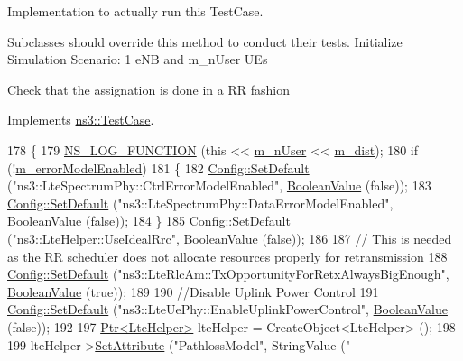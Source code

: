 Implementation to actually run this Test\+Case. 

Subclasses should override this method to conduct their tests. Initialize Simulation Scenario\+: 1 e\+NB and m\+\_\+n\+User U\+Es

Check that the assignation is done in a RR fashion

Implements \hyperlink{classns3_1_1TestCase_a8ff74680cf017ed42011e4be51917a24}{ns3\+::\+Test\+Case}.


\begin{DoxyCode}
178 \{
179   \hyperlink{log-macros-disabled_8h_a90b90d5bad1f39cb1b64923ea94c0761}{NS\_LOG\_FUNCTION} (\textcolor{keyword}{this} << \hyperlink{classLenaRrFfMacSchedulerTestCase_a8973c6783abfcb4f86d2eed09f96771e}{m\_nUser} << \hyperlink{classLenaRrFfMacSchedulerTestCase_acfeb04f33db41e95247adca7a4bef11d}{m\_dist});
180   \textcolor{keywordflow}{if} (!\hyperlink{classLenaRrFfMacSchedulerTestCase_a9d0173c247c23e56278cd09225c4b7d5}{m\_errorModelEnabled})
181     \{
182       \hyperlink{group__config_ga2e7882df849d8ba4aaad31c934c40c06}{Config::SetDefault} (\textcolor{stringliteral}{"ns3::LteSpectrumPhy::CtrlErrorModelEnabled"}, 
      \hyperlink{classns3_1_1BooleanValue}{BooleanValue} (\textcolor{keyword}{false}));
183       \hyperlink{group__config_ga2e7882df849d8ba4aaad31c934c40c06}{Config::SetDefault} (\textcolor{stringliteral}{"ns3::LteSpectrumPhy::DataErrorModelEnabled"}, 
      \hyperlink{classns3_1_1BooleanValue}{BooleanValue} (\textcolor{keyword}{false}));
184     \}
185   \hyperlink{group__config_ga2e7882df849d8ba4aaad31c934c40c06}{Config::SetDefault} (\textcolor{stringliteral}{"ns3::LteHelper::UseIdealRrc"}, 
      \hyperlink{classns3_1_1BooleanValue}{BooleanValue} (\textcolor{keyword}{false}));
186 
187   \textcolor{comment}{// This is needed as the RR scheduler does not allocate resources properly for retransmission}
188   \hyperlink{group__config_ga2e7882df849d8ba4aaad31c934c40c06}{Config::SetDefault} (\textcolor{stringliteral}{"ns3::LteRlcAm::TxOpportunityForRetxAlwaysBigEnough"}, 
      \hyperlink{classns3_1_1BooleanValue}{BooleanValue} (\textcolor{keyword}{true}));
189 
190   \textcolor{comment}{//Disable Uplink Power Control}
191   \hyperlink{group__config_ga2e7882df849d8ba4aaad31c934c40c06}{Config::SetDefault} (\textcolor{stringliteral}{"ns3::LteUePhy::EnableUplinkPowerControl"}, 
      \hyperlink{classns3_1_1BooleanValue}{BooleanValue} (\textcolor{keyword}{false}));
192 
197   \hyperlink{classns3_1_1Ptr}{Ptr<LteHelper>} lteHelper = CreateObject<LteHelper> ();
198   
199   lteHelper->\hyperlink{classns3_1_1ObjectBase_ac60245d3ea4123bbc9b1d391f1f6592f}{SetAttribute} (\textcolor{stringliteral}{"PathlossModel"}, StringValue (\textcolor{stringliteral}{"
}
\end{DoxyCode}
